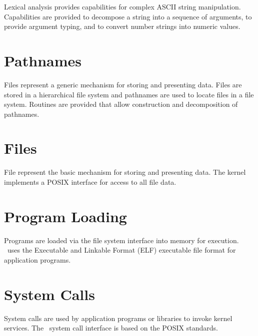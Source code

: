 Lexical analysis provides capabilities for complex ASCII string
manipulation.  Capabilities are provided to decompose a string
into a sequence of arguments, to provide argument typing, and
to convert number strings into numeric values.


\chapter{Pathnames}

Files represent a generic mechanism for storing and presenting
data.  Files are stored in a hierarchical file system and
pathnames are used to locate files in a file system.  Routines
are provided that allow construction and decomposition of
pathnames.


\chapter{Files}

File represent the basic mechanism for storing and presenting
data.  The kernel implements a POSIX interface for access to
all file data.


\chapter{Program Loading}

Programs are loaded via the file system interface into memory
for execution.  \roadrunner\  uses the Executable and Linkable
Format (ELF) executable file format for application programs.


\chapter{System Calls}

System calls are used by application programs or libraries to
invoke kernel services.  The \roadrunner\  system call interface
is based on the POSIX standards.



